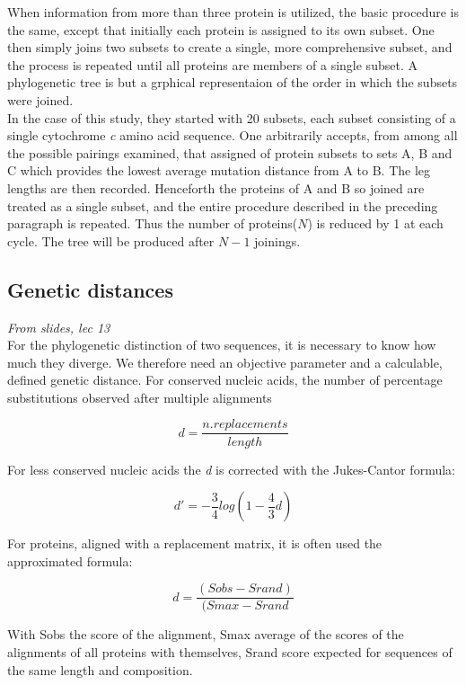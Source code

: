 When information from more than three protein is utilized, the basic procedure is the same, except that initially each protein is assigned to its own subset. One then simply joins two subsets to create a single, more comprehensive subset, and the process is repeated until all proteins are members of  a single subset. 
A phylogenetic tree is but a grphical representaion of the order in which the subsets were joined. 
\\
In the case of this study, they started with 20 subsets, each subset consisting of a single cytochrome \textit{c} amino acid sequence. One arbitrarily accepts, from among all the possible pairings examined, that assigned of protein subsets to sets A, B and C which provides the lowest average mutation distance from A to B. The leg lengths are then recorded. Henceforth the proteins of A and B so joined are treated as a single subset, and the entire procedure described in the preceding paragraph is repeated.  Thus the number of proteins($N$) is reduced by 1 at each cycle. The tree will be produced after $N-1$ joinings. 

\subsection{Genetic distances}
\emph{From slides, lec 13}
\\
For the phylogenetic distinction of two sequences, it is necessary to know how much they diverge. We therefore need an objective parameter and a calculable, defined genetic distance. 
For conserved nucleic acids, the number of percentage substitutions observed after multiple alignments

\begin{equation}
d = \frac{n. replacements}{length}
\end{equation}

For less conserved nucleic acids the \textit{d} is corrected with the Jukes-Cantor formula:

\begin{equation}
d'= -\frac{3}{4}log(1- \frac{4}{3} d)
\end{equation}

For proteins, aligned with a replacement matrix, it is often used the approximated formula:

\begin{equation}
d =  \frac{(Sobs - Srand)}{(Smax -Srand}
\end{equation}

With Sobs the score of the alignment, Smax average of the scores of the alignments of all proteins with themselves, Srand score expected for sequences of the same length and composition. 

